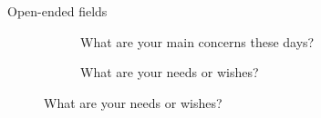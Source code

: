 \documentclass[aspectratio=169,xcolor=dvipsnames, 11pt,mathserif]{beamer}
\begin{document}
\begin{frame}{Open-ended fields}
    \begin{figure}
\vspace{-.3cm}
\begin{subfigure}{.49\textwidth}
  \caption{What are your main concerns these days?}\vspace{-.3cm}
\end{subfigure} 
\begin{subfigure}{.49\textwidth}
  \caption{What are your needs or wishes?} \vspace{-.3cm}

\end{subfigure}
\end{figure}
\end{frame}
\end{document}
